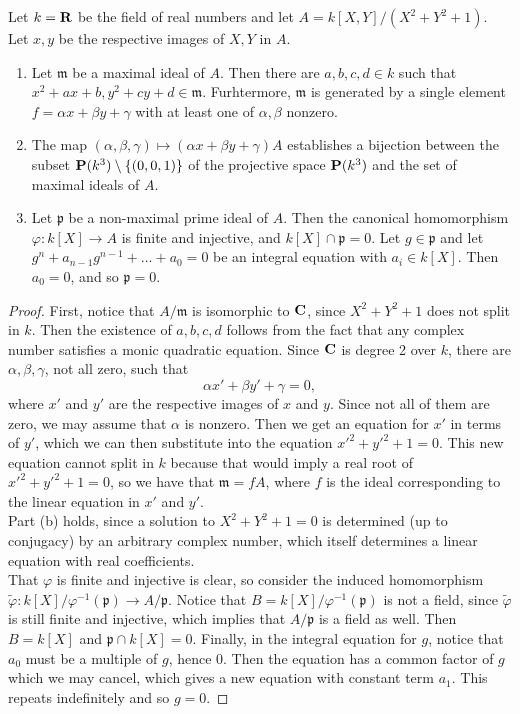 \begin{exer}
	Let $k = \mathbf{R}$ be the field of real numbers and let
	$A = k[X,Y]/(X^2 + Y^2 + 1)$. Let $x,y$ be the respective images of
	$X,Y$ in $A$.
	\begin{enumerate}[label=(\alph*)]
		\item Let $\mathfrak m$ be a maximal ideal of $A$. Then there
			are $a,b,c,d \in k$ such that
			$x^2 + ax + b,y^2 + cy + d \in \mathfrak m$.
			Furhtermore, $\mathfrak m$ is generated by a single
			element $f = \alpha x + \beta y + \gamma$ with at least
			one of $\alpha,\beta$ nonzero.
		\item The map $(\alpha,\beta,\gamma) 
			\mapsto (\alpha x + \beta y + \gamma)A$ establishes a
			bijection between the subset
			$\mathbf{P}(k^3) \setminus \{ (0,0,1) \}$ of the projective
			space $\mathbf{P}(k^3)$ and the set of maximal ideals of $A$.
		\item Let $\mathfrak p$ be a non-maximal prime ideal of $A$.
			Then the canonical homomorphism $\varphi: k[X] \to A$
			is finite and injective, and
			$k[X] \cap \mathfrak p = 0.$ Let $g \in \mathfrak p$
			and let $g^n + a_{n-1}g^{n-1} + \ldots + a_0 = 0$ be an
			integral equation with $a_i \in k[X]$. Then
			$a_0 = 0$, and so $\mathfrak p = 0$.
	\end{enumerate}
\end{exer}
\begin{proof}
	First, notice that $A/\mathfrak m$ is isomorphic to $\mathbf{C}$, since
	$X^2 + Y^2 + 1$ does not split in $k$. Then the existence of $a,b,c,d$
	follows from the fact that any complex number satisfies a monic
	quadratic equation. Since $\mathbf{C}$ is degree 2 over $k$, there are
	$\alpha,\beta,\gamma$, not all zero, such that
	\[
		\alpha x' + \beta y' + \gamma = 0,
	\]
	where $x'$ and $y'$ are the respective images of $x$ and $y$. Since not
	all of them are zero, we may assume that $\alpha$ is nonzero. Then we
	get an equation for $x'$ in terms of $y'$, which we can then substitute
	into the equation $x'^2 + y'^2 + 1 = 0$. This new equation cannot split
	in $k$ because that would imply a real root of $x'^2 + y'^2 + 1 = 0$,
	so we have that $\mathfrak m = fA$, where $f$ is the ideal
	corresponding to the linear equation in $x'$ and $y'$.\\

	Part (b) holds, since a solution to $X^2 + Y^2 + 1 =0$ is
	determined (up to conjugacy) by an arbitrary complex number, which
	itself determines a linear equation with real coefficients.\\

	That $\varphi$ is finite and injective is clear, so consider the
	induced homomorphism
	$\widetilde{\varphi}: k[X]/\varphi^{-1}(\mathfrak p)\to A/\mathfrak p.$
	Notice that $B = k[X]/\varphi^{-1}(\mathfrak p)$ is not a field, since
	$\widetilde{\varphi}$ is still finite and injective, which implies that
	$A/\mathfrak p$ is a field as well. Then $B = k[X]$ and
	$\mathfrak p \cap k[X] = 0$. Finally, in the integral equation for $g$,
	notice that $a_0$ must be a multiple of $g$, hence 0. Then the equation
	has a common factor of $g$ which we may cancel, which gives a new 
	equation with constant term $a_1$. This repeats indefinitely and so
	$g = 0$.
\end{proof}

